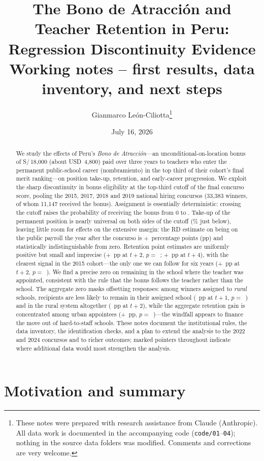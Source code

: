 \documentclass[11pt]{article}
\title{The Bono de Atracci\'on and Teacher Retention in Peru:\\
Regression Discontinuity Evidence\\[6pt]
\large Working notes -- first results, data inventory, and next steps}
\author{Gianmarco Le\'on-Ciliotta\thanks{These notes were prepared with research
assistance from Claude (Anthropic). All data work is documented in the
accompanying code (\texttt{code/01}--\texttt{04}); nothing in the source data
folders was modified. Comments and corrections are very welcome.}}
\date{July 16, 2026}
\begin{document}
\maketitle

\begin{abstract}
\noindent We study the effects of Peru's \emph{Bono de Atracci\'on}---an
unconditional-on-location bonus of S/\,18,000 (about USD~4,800) paid over
three years to teachers who enter the permanent public-school career
(nombramiento) in the top third of their cohort's final merit ranking---on
position take-up, retention, and early-career progression. We exploit the
sharp discontinuity in bonus eligibility at the top-third cutoff of the final
concurso score, pooling the 2015, 2017, 2018 and 2019 national hiring
concursos (33,383 winners, of whom 11,147 received the bonus). Assignment is
essentially deterministic: crossing the cutoff raises the probability of
receiving the bonus from 0 to \FSpooledTen. Take-up of the permanent position
is nearly universal on both sides of the cutoff (\AcceptMean\% just below),
leaving little room for effects on the extensive margin: the RD estimate on
being on the public payroll the year after the concurso is
+\AcceptRF~percentage points (pp) and statistically indistinguishable from
zero. Retention point estimates are uniformly positive but small and
imprecise (+\RetainTwoRF~pp at $t+2$, $p=$~\RetainTwoP; +\RetainFourRF~pp at
$t+4$), with the clearest signal in the 2015 cohort---the only one we can
follow for six years (+\RetainTwoFifteenRF~pp at $t+2$,
$p=$~\RetainTwoFifteenP). We find a precise zero on remaining in the school
where the teacher was appointed, consistent with the rule that the bonus
follows the teacher rather than the school. The aggregate zero masks
offsetting responses: among winners assigned to \emph{rural} schools,
recipients are less likely to remain in their assigned school
(\RuralSameschRF~pp at $t+1$, $p=$~\RuralSameschP) and in the rural system
altogether (\InruralRuralRF~pp at $t+2$), while the aggregate retention gain
is concentrated among urban appointees (+\UrbanRetainRF~pp,
$p=$~\UrbanRetainP)---the windfall appears to finance the move out of
hard-to-staff schools. These notes document the institutional rules, the data inventory,
the identification checks, and a plan to extend the analysis to the 2022 and
2024 concursos and to richer outcomes; marked pointers throughout indicate
where additional data would most strengthen the analysis.
\end{abstract}

\section{Motivation and summary}
\end{document}

